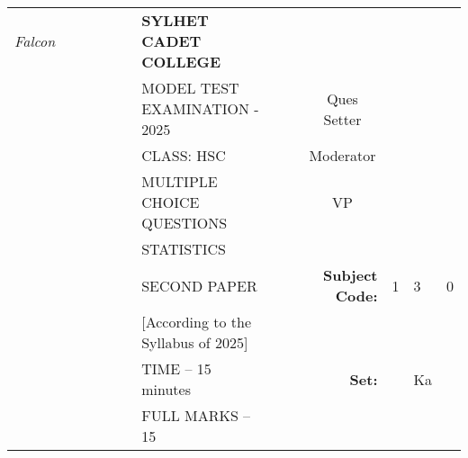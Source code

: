 \documentclass[12pt]{exam}
\begin{document}
\begin{table}[]
\begin{tabular}{lllllllllrlll}
\textit{Falcon} &  &  &  &  &  & \textbf{SYLHET CADET COLLEGE}       &  &                       & \multicolumn{1}{l}{}                        &                        &                        &                        \\ \cline{10-13} 
       &  &  &  &  &  & MODEL TEST EXAMINATION - 2025             &  & \multicolumn{1}{l|}{} & \multicolumn{1}{c|}{Ques Setter}            & \multicolumn{3}{l|}{}                                                    \\ \cline{10-13} 
       &  &  &  &  &  & CLASS: HSC                          &  & \multicolumn{1}{l|}{} & \multicolumn{1}{c|}{Moderator}              & \multicolumn{3}{l|}{}                                                    \\ \cline{10-13} 
       &  &  &  &  &  & MULTIPLE CHOICE QUESTIONS           &  & \multicolumn{1}{l|}{} & \multicolumn{1}{c|}{VP}                     & \multicolumn{3}{l|}{}                                                    \\ \cline{10-13} 
       &  &  &  &  &  & STATISTICS                          &  &                       &                                             &                        &                        &                        \\ \cline{11-13} 
       &  &  &  &  &  & SECOND PAPER                        &  &                       & \multicolumn{1}{r|}{\textbf{Subject Code:}} & \multicolumn{1}{l|}{1} & \multicolumn{1}{l|}{3} & \multicolumn{1}{l|}{0} \\ \cline{11-13} 
       &  &  &  &  &  & [According to the Syllabus of 2025] &  &                       &                                             &                        &                        &                        \\ \cline{12-12}
       &  &  &  &  &  & TIME – 15 minutes                   &  &                       & \textbf{Set:}                               & \multicolumn{1}{l|}{}  & \multicolumn{1}{l|}{Ka} &                        \\ \cline{12-12}
       &  &  &  &  &  & FULL MARKS – 15                     &  &                       & \multicolumn{1}{l}{}                        &                        &                        &                       
\end{tabular}
\end{table}
\end{document}
